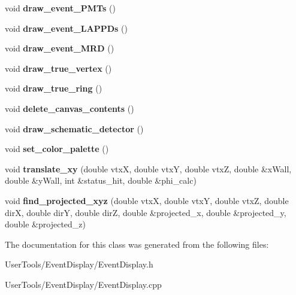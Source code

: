 \begin{DoxyCompactItemize}
\item 
\hypertarget{classEventDisplay_a69683e114fa3e1702ba154789672f492}{
void {\bfseries draw\_\-event\_\-PMTs} ()}
\label{classEventDisplay_a69683e114fa3e1702ba154789672f492}

\item 
\hypertarget{classEventDisplay_ae0d1b0fb901484e92518ec76061c5c9c}{
void {\bfseries draw\_\-event\_\-LAPPDs} ()}
\label{classEventDisplay_ae0d1b0fb901484e92518ec76061c5c9c}

\item 
\hypertarget{classEventDisplay_a8c3315cc4f055772b275e7a5c9593526}{
void {\bfseries draw\_\-event\_\-MRD} ()}
\label{classEventDisplay_a8c3315cc4f055772b275e7a5c9593526}

\item 
\hypertarget{classEventDisplay_a13ff76de80459d2b68e24dbd0b24416e}{
void {\bfseries draw\_\-true\_\-vertex} ()}
\label{classEventDisplay_a13ff76de80459d2b68e24dbd0b24416e}

\item 
\hypertarget{classEventDisplay_ad9e11e4c29bf6cd9c616e8a88c9450a5}{
void {\bfseries draw\_\-true\_\-ring} ()}
\label{classEventDisplay_ad9e11e4c29bf6cd9c616e8a88c9450a5}

\item 
\hypertarget{classEventDisplay_a0c142aae987bce6741becd4254993e4b}{
void {\bfseries delete\_\-canvas\_\-contents} ()}
\label{classEventDisplay_a0c142aae987bce6741becd4254993e4b}

\item 
\hypertarget{classEventDisplay_a8e03ad3c8e618e6781a8e085d4577083}{
void {\bfseries draw\_\-schematic\_\-detector} ()}
\label{classEventDisplay_a8e03ad3c8e618e6781a8e085d4577083}

\item 
\hypertarget{classEventDisplay_a8e0374381693a843b58d33ac4a3debd9}{
void {\bfseries set\_\-color\_\-palette} ()}
\label{classEventDisplay_a8e0374381693a843b58d33ac4a3debd9}

\item 
\hypertarget{classEventDisplay_a3e7298c6aab4ea268f51a6c805ccdc9a}{
void {\bfseries translate\_\-xy} (double vtxX, double vtxY, double vtxZ, double \&xWall, double \&yWall, int \&status\_\-hit, double \&phi\_\-calc)}
\label{classEventDisplay_a3e7298c6aab4ea268f51a6c805ccdc9a}

\item 
\hypertarget{classEventDisplay_a0a3b0b46289031922181d43a7db56271}{
void {\bfseries find\_\-projected\_\-xyz} (double vtxX, double vtxY, double vtxZ, double dirX, double dirY, double dirZ, double \&projected\_\-x, double \&projected\_\-y, double \&projected\_\-z)}
\label{classEventDisplay_a0a3b0b46289031922181d43a7db56271}

\end{DoxyCompactItemize}


The documentation for this class was generated from the following files:\begin{DoxyCompactItemize}
\item 
UserTools/EventDisplay/EventDisplay.h\item 
UserTools/EventDisplay/EventDisplay.cpp\end{DoxyCompactItemize}
